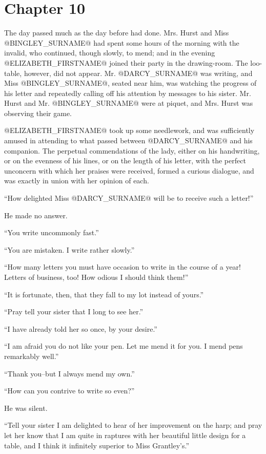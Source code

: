 \chapter*{Chapter 10}


The day passed much as the day before had done. Mrs. Hurst and Miss
@BINGLEY_SURNAME@ had spent some hours of the morning with the invalid, who
continued, though slowly, to mend; and in the evening @ELIZABETH_FIRSTNAME@ joined
their party in the drawing-room. The loo-table, however, did not appear.
Mr. @DARCY_SURNAME@ was writing, and Miss @BINGLEY_SURNAME@, seated near him, was watching
the progress of his letter and repeatedly calling off his attention by
messages to his sister. Mr. Hurst and Mr. @BINGLEY_SURNAME@ were at piquet, and
Mrs. Hurst was observing their game.

@ELIZABETH_FIRSTNAME@ took up some needlework, and was sufficiently amused in
attending to what passed between @DARCY_SURNAME@ and his companion. The perpetual
commendations of the lady, either on his handwriting, or on the evenness
of his lines, or on the length of his letter, with the perfect unconcern
with which her praises were received, formed a curious dialogue, and was
exactly in union with her opinion of each.

``How delighted Miss @DARCY_SURNAME@ will be to receive such a letter!''

He made no answer.

``You write uncommonly fast.''

``You are mistaken. I write rather slowly.''

``How many letters you must have occasion to write in the course of a
year! Letters of business, too! How odious I should think them!''

``It is fortunate, then, that they fall to my lot instead of yours.''

``Pray tell your sister that I long to see her.''

``I have already told her so once, by your desire.''

``I am afraid you do not like your pen. Let me mend it for you. I mend
pens remarkably well.''

``Thank you--but I always mend my own.''

``How can you contrive to write so even?''

He was silent.

``Tell your sister I am delighted to hear of her improvement on the harp;
and pray let her know that I am quite in raptures with her beautiful
little design for a table, and I think it infinitely superior to Miss
Grantley's.''

